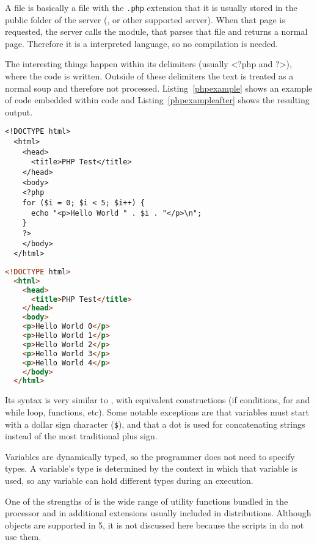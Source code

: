 A  file is basically a  file with the \texttt{.php} extension that it is usually stored in the public folder of the server (,  or other supported server).
When that page is requested, the server calls the  module, that parses that file and returns a normal  page.
Therefore it is a interpreted language, so no compilation is needed.

The interesting things happen within its delimiters
(usually <?php and ?>), where the  code is written.
Outside of these delimiters the text is treated as a normal  soup and therefore not processed.
Listing~\ref{phpexample} shows an example of  code embedded within  code and Listing~\ref{phpexampleafter} shows the resulting  output.

\begin{lstlisting}[float=htbp,label=phpexample,language={[phpoo]php},alsolanguage=html,caption=\idx{PHP} code embedded within \idx{HTML} code] % java
  <!DOCTYPE html>
  <html>
    <head>
      <title>PHP Test</title>
    </head>
    <body>
    <?php
    for ($i = 0; $i < 5; $i++) {
      echo "<p>Hello World " . $i . "</p>\n";
    }
    ?>
    </body>
  </html>
\end{lstlisting}

\begin{lstlisting}[float=htbp,label=phpexampleafter,language=html,caption=Resulting \idx{HTML} code]
  <!DOCTYPE html>
  <html>
    <head>
      <title>PHP Test</title>
    </head>
    <body>
    <p>Hello World 0</p>
    <p>Hello World 1</p>
    <p>Hello World 2</p>
    <p>Hello World 3</p>
    <p>Hello World 4</p>
    </body>
  </html>
\end{lstlisting}

Its syntax is very similar to , with equivalent constructions (if conditions, for and while loop, functions, etc).
Some notable exceptions are that variables must start with a dollar sign character (\texttt{\$}), and that a dot is used for concatenating strings instead of the most traditional plus sign.

Variables are dynamically typed, so the programmer does not need to specify types. A variable's type is determined by the context in which that variable is used, so any variable can hold different types during an execution.

One of the strengths of  is the wide range of utility functions bundled in the processor and in additional extensions usually included in distributions.
Although objects are supported in  5, it is not discussed here because the scripts in  do not use them.

